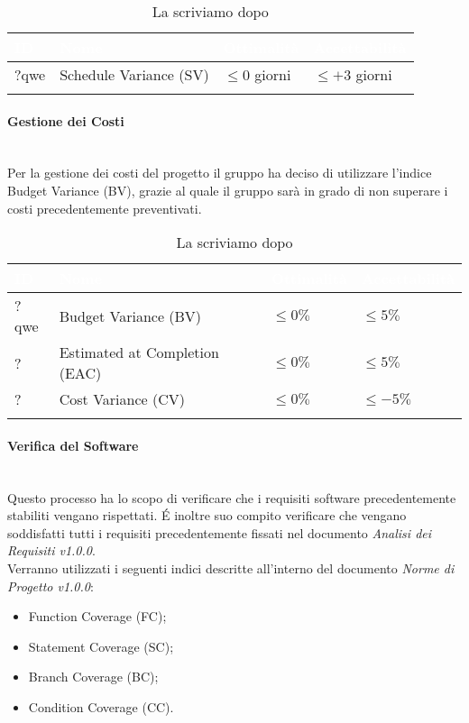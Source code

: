 \begin{longtable}{|C{.15\textwidth}|C{.24\textwidth}|C{.24\textwidth}|C{.24\textwidth}|}
\hline
{}\textbf{\textcolor{white}{ID}} & \textbf{\textcolor{white}{Nome}} & \textbf{\textcolor{white}{Ottimalità}} & \textbf{\textcolor{white}{Accettabilità}}\\
\hline \hline
\endfirsthead
?qwe & Schedule Variance (SV) & $\leqslant 0$ giorni & $\leqslant +3$ giorni \\
\hline
\caption{La scriviamo dopo}
\label{La scriviamo dopo}
\end{longtable}

\paragraph{Gestione dei Costi} \-\\
Per la gestione dei costi del progetto il gruppo ha deciso di utilizzare l'indice Budget Variance (BV), grazie al quale il gruppo sarà in grado di non superare i costi precedentemente preventivati.  

\begin{longtable}{|C{.15\textwidth}|C{.24\textwidth}|C{.24\textwidth}|C{.24\textwidth}|}
\hline
{}\textbf{\textcolor{white}{ID}} & \textbf{\textcolor{white}{Nome}} & \textbf{\textcolor{white}{Ottimalità}} & \textbf{\textcolor{white}{Accettabilità}}\\
\hline \hline
\endfirsthead
?qwe & Budget Variance (BV) & $\leqslant 0\% $ & $\leqslant 5\%$ \\
\hline
{}? & Estimated at Completion (EAC) & $\leqslant 0\% $ & $\leqslant 5\%$ \\
\hline
? & Cost Variance (CV) & $\leqslant 0\% $ & $ \leqslant -5\%$ \\
\hline
\caption{La scriviamo dopo}
\label{La scriviamo dopo}
\end{longtable}

\paragraph{Verifica del Software}\-\\
Questo processo ha lo scopo di verificare che i requisiti software precedentemente stabiliti vengano rispettati. \'E inoltre suo compito verificare che vengano soddisfatti tutti i requisiti precedentemente fissati nel documento \textit{Analisi dei Requisiti v1.0.0}.\\
Verranno utilizzati i seguenti indici descritte all'interno del documento \textit{Norme di Progetto v1.0.0}:
\begin{itemize}
	\item Function Coverage (FC);
	\item Statement Coverage (SC);
	\item Branch Coverage (BC);
	\item Condition Coverage (CC).
\end{itemize}

